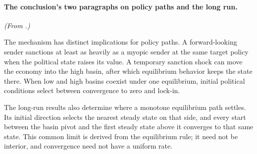 \paragraph{The conclusion's two paragraphs on policy paths and the long run.} \emph{(From .)}

The mechanism has distinct implications for policy paths. A
forward-looking sender sanctions at least as heavily as a myopic sender
at the same target policy when the political state raises its value. A
temporary sanction shock can move the economy into the high
basin, after which equilibrium behavior keeps the state there. When low
and high basins coexist under one equilibrium, initial political
conditions select between convergence to zero and lock-in.

The long-run results also determine where a monotone equilibrium path
settles. Its initial direction selects the nearest steady state on that
side, and every start between the basin pivot and the first steady state
above it converges to that same state. This common limit is derived from
the equilibrium rule; it need not be interior, and convergence need not
have a uniform rate.
